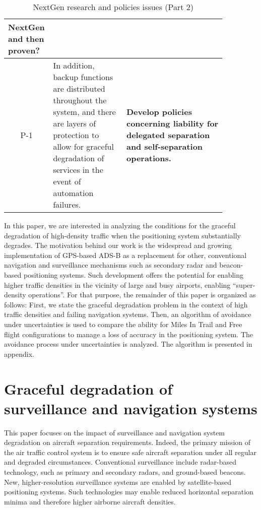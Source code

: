 \documentclass[a4paper, 10pt]{IEEEtran}
\begin{document}
\begin{table}[ht]
\begin{center}
\begin{tabular}{|p{0.08\linewidth}|p{0.33\linewidth}|p{0.45\linewidth}|}
{NextGen and then proven?}\\ 
    \hline
\multicolumn{1}{|c|}{P-1} & In addition, backup functions are distributed throughout the system, and there are layers of protection to allow for graceful degradation of services in the event of automation failures.& \textbf{Develop policies concerning liability for delegated separation and self-separation operations.}\\
\hline
    \end{tabular}\caption{NextGen research and policies issues (Part 2)}\label{tab:NextgenResearch}
\end{center}
\end{table}














In this paper, we are interested in analyzing the conditions for the
graceful degradation of high-density traffic when the positioning system
substantially degrades. The motivation behind
our work is the widespread and growing implementation of GPS-based ADS-B as
a replacement for other, conventional navigation and surveillance
mechanisms such as secondary radar and beacon-based positioning systems.
Such development offers the potential for enabling higher traffic densities
in the vicinity of large and busy airports, enabling ``super-density operations''\cite{nextGen}. For that purpose, the remainder
of this paper is organized as follows: First, we state the
graceful  degradation problem in the context of high traffic densities and
failing navigation systems. Then, an algorithm of avoidance
under uncertainties is used to compare the ability for Miles In Trail and Free flight
configurations to manage a loss of accuracy in the positioning
system. The avoidance process under uncertainties is analyzed. The algorithm is presented in appendix.









\section{Graceful degradation of surveillance and navigation systems}

This paper focuses on the impact of surveillance and navigation system
degradation on aircraft separation requirements. Indeed, the primary
mission of the air traffic control system is to ensure safe aircraft
separation under all regular and degraded circumstances. Conventional
surveillance include radar-based technology, such as primary and secondary
radars, and ground-based beacons. New, higher-resolution surveillance
systems are enabled by satellite-based positioning systems. Such technologies may enable reduced
horizontal separation minima and therefore higher airborne aircraft densities.
\end{document}
